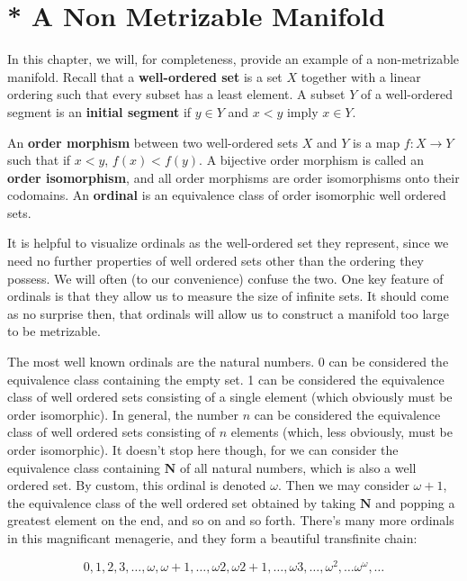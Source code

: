 \section{* A Non Metrizable Manifold}

In this chapter, we will, for completeness, provide an example of a non-metrizable manifold. Recall that a {\bf well-ordered set} is a set $X$ together with a linear ordering such that every subset has a least element. A subset $Y$ of a well-ordered segment is an {\bf initial segment} if $y \in Y$ and $x < y$ imply $x \in Y$.

\begin{definition}
    An {\bf order morphism} between two well-ordered sets $X$ and $Y$ is a map $f:X \to Y$ such that if $x < y$, $f(x) < f(y)$. A bijective order morphism is called an {\bf order isomorphism}, and all order morphisms are order isomorphisms onto their codomains. An {\bf ordinal} is an equivalence class of order isomorphic well ordered sets.
\end{definition}

It is helpful to visualize ordinals as the well-ordered set they represent, since we need no further properties of well ordered sets other than the ordering they possess. We will often (to our convenience) confuse the two. One key feature of ordinals is that they allow us to measure the size of infinite sets. It should come as no surprise then, that ordinals will allow us to construct a manifold too large to be metrizable.

The most well known ordinals are the natural numbers. 0 can be considered the equivalence class containing the empty set. 1 can be considered the equivalence class of well ordered sets consisting of a single element (which obviously must be order isomorphic). In general, the number $n$ can be considered the equivalence class of well ordered sets consisting of $n$ elements (which, less obviously, must be order isomorphic). It doesn't stop here though, for we can consider the equivalence class containing $\mathbf{N}$ of all natural numbers, which is also a well ordered set. By custom, this ordinal is denoted $\omega$. Then we may consider $\omega + 1$, the equivalence class of the well ordered set obtained by taking $\mathbf{N}$ and popping a greatest element on the end, and so on and so forth. There's many more ordinals in this magnificant menagerie, and they form a beautiful transfinite chain:

\[ 0, 1, 2, 3, \dots, \omega, \omega + 1, \dots, \omega 2, \omega 2 + 1, \dots, \omega 3, \dots, \omega^2, \dots \omega^\omega, \dots  \]

